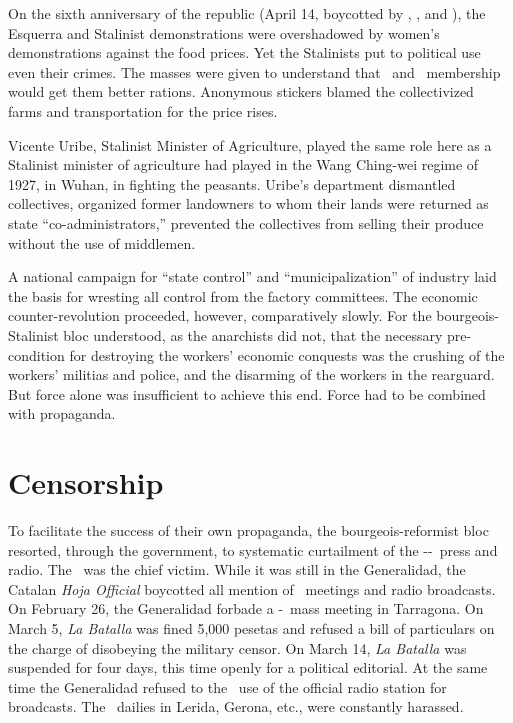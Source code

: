 On the sixth anniversary of the republic (April 14, boycotted by \FAI, \CNT, and \POUM), the Esquerra and Stalinist demonstrations were overshadowed by women’s demonstrations against the food prices. Yet the Stalinists put to political use even their crimes. The masses were given to understand that \PSUC\ and \UGT\ membership would get them better rations. Anonymous stickers blamed the collectivized farms and transportation for the price rises.

Vicente Uribe, Stalinist Minister of Agriculture, played the same role here as a Stalinist minister of agriculture had played in the Wang Ching-wei regime of 1927, in Wuhan, in fighting the peasants. Uribe’s department dismantled collectives, organized former landowners to whom their lands were returned as state ``co-administrators,'' prevented the collectives from selling their produce without the use of middlemen.

A national campaign for ``state control'' and ``municipalization'' of industry laid the basis for wresting all control from the factory committees. The economic counter-revolution proceeded, however, comparatively slowly. For the bourgeois-Stalinist bloc understood, as the anarchists did not, that the necessary pre-condition for destroying the workers’ economic conquests was the crushing of the workers’ militias and police, and the disarming of the workers in the rearguard. But force alone was insufficient to achieve this end. Force had to be combined with propaganda.

\section*{Censorship}

To facilitate the success of their own propaganda, the bourgeois-reformist bloc resorted, through the government, to systematic curtailment of the \CNT-\FAI-\POUM\ press and radio. The \POUM\ was the chief victim. While it was still in the Generalidad, the Catalan \emph{Hoja Official} boycotted all mention of \POUM\ meetings and radio broadcasts. On February 26, the Generalidad forbade a \CNT-\POUM\ mass meeting in Tarragona. On March 5, \emph{La Batalla} was fined 5,000 pesetas and refused a bill of particulars on the charge of disobeying the military censor. On March 14, \emph{La Batalla} was suspended for four days, this time openly for a political editorial. At the same time the Generalidad refused to the \POUM\ use of the official radio station for broadcasts. The \POUM\ dailies in Lerida, Gerona, etc., were constantly harassed.

